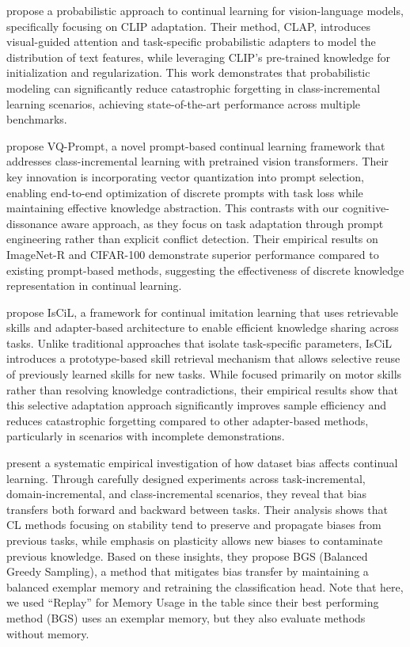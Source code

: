 \citet{jha2024clap4clip} propose a probabilistic approach to continual learning for vision-language models, specifically focusing on CLIP adaptation. Their method, CLAP, introduces visual-guided attention and task-specific probabilistic adapters to model the distribution of text features, while leveraging CLIP's pre-trained knowledge for initialization and regularization. This work demonstrates that probabilistic modeling can significantly reduce catastrophic forgetting in class-incremental learning scenarios, achieving state-of-the-art performance across multiple benchmarks.

\citet{jiao2024vector} propose VQ-Prompt, a novel prompt-based continual learning framework that addresses class-incremental learning with pretrained vision transformers. Their key innovation is incorporating vector quantization into prompt selection, enabling end-to-end optimization of discrete prompts with task loss while maintaining effective knowledge abstraction. This contrasts with our cognitive-dissonance aware approach, as they focus on task adaptation through prompt engineering rather than explicit conflict detection. Their empirical results on ImageNet-R and CIFAR-100 demonstrate superior performance compared to existing prompt-based methods, suggesting the effectiveness of discrete knowledge representation in continual learning.

\cite{lee2024incremental} propose IsCiL, a framework for continual imitation learning that uses retrievable skills and adapter-based architecture to enable efficient knowledge sharing across tasks. Unlike traditional approaches that isolate task-specific parameters, IsCiL introduces a prototype-based skill retrieval mechanism that allows selective reuse of previously learned skills for new tasks. While focused primarily on motor skills rather than resolving knowledge contradictions, their empirical results show that this selective adaptation approach significantly improves sample efficiency and reduces catastrophic forgetting compared to other adapter-based methods, particularly in scenarios with incomplete demonstrations.

\citet{leecontinual} present a systematic empirical investigation of how dataset bias affects continual learning. Through carefully designed experiments across task-incremental, domain-incremental, and class-incremental scenarios, they reveal that bias transfers both forward and backward between tasks. Their analysis shows that CL methods focusing on stability tend to preserve and propagate biases from previous tasks, while emphasis on plasticity allows new biases to contaminate previous knowledge. Based on these insights, they propose BGS (Balanced Greedy Sampling), a method that mitigates bias transfer by maintaining a balanced exemplar memory and retraining the classification head. Note that here, we used ``Replay'' for Memory Usage in the table since their best performing method (BGS) uses an exemplar memory, but they also evaluate methods without memory. 

